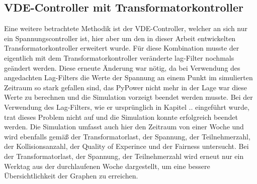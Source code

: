 \subsection{VDE-Controller mit Transformatorkontroller}
\label{chap_VDE_t}
Eine weitere betrachtete Methodik ist der VDE-Controller, welcher an sich nur ein Spannungscontroller ist, hier aber um den in dieser Arbeit entwickelten Transformatorkontroller erweitert wurde. Für diese Kombination musste der eigentlich mit dem Transformatorkontroller veränderte lag-Filter nochmals geändert werden. Diese erneute Änderung war nötig, da bei Verwendung des angedachten Lag-Filters  die Werte der Spannung an einem Punkt im simulierten Zeitraum so stark gefallen sind, das PyPower nicht mehr in der Lage war diese Werte zu berechnen und die Simulation vorzeigt beendet werden musste. Bei der Verwendung des Lag-Filters, wie er ursprünglich in Kapitel .. eingeführt wurde, trat dieses Problem nicht auf und die Simulation konnte erfolgreich beendet werden. Die Simulation umfasst auch hier den Zeitraum von einer Woche und wird ebenfalls gemäß der Transformatorlast, der Spannung, der Teilnehmerzahl, der Kollisionsanzahl, der Quality of Experince und der Fairness untersucht. Bei der Transformatorlast, der Spannung, der Teilnehmerzahl wird erneut nur ein Werktag aus der durchlaufenen Woche dargestellt, um eine bessere Übersichtlichkeit der Graphen zu erreichen. \\
